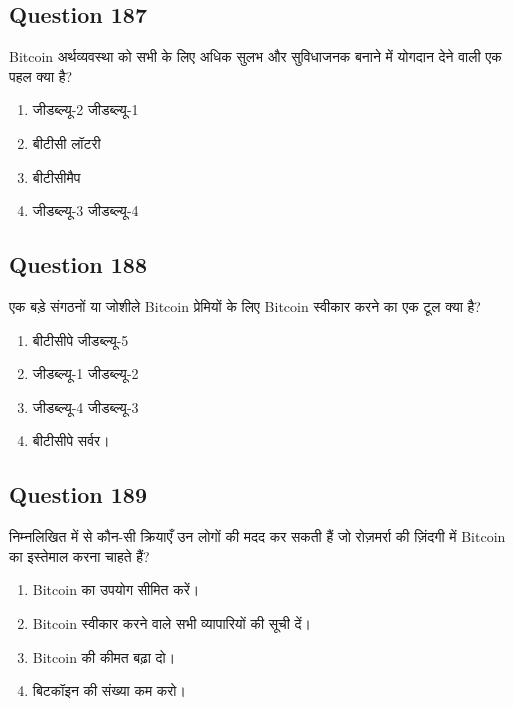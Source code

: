 \documentclass[12pt,a4paper]{article}
\begin{document}
\bigskip


\subsection*{Question 187}
Bitcoin अर्थव्यवस्था को सभी के लिए अधिक सुलभ और सुविधाजनक बनाने में योगदान देने वाली एक पहल क्या है?

\begin{enumerate}[label=\Alph*., leftmargin=*]
\item जीडब्ल्यू-2 जीडब्ल्यू-1
\item बीटीसी लॉटरी
\item बीटीसीमैप
\item जीडब्ल्यू-3 जीडब्ल्यू-4
\end{enumerate}

\bigskip


\subsection*{Question 188}
एक बड़े संगठनों या जोशीले Bitcoin प्रेमियों के लिए Bitcoin स्वीकार करने का एक टूल क्या है?

\begin{enumerate}[label=\Alph*., leftmargin=*]
\item बीटीसीपे जीडब्ल्यू-5
\item जीडब्ल्यू-1 जीडब्ल्यू-2
\item जीडब्ल्यू-4 जीडब्ल्यू-3
\item बीटीसीपे सर्वर।
\end{enumerate}

\bigskip


\subsection*{Question 189}
निम्नलिखित में से कौन-सी क्रियाएँ उन लोगों की मदद कर सकती हैं जो रोज़मर्रा की ज़िंदगी में Bitcoin का इस्तेमाल करना चाहते हैं?

\begin{enumerate}[label=\Alph*., leftmargin=*]
\item Bitcoin का उपयोग सीमित करें।
\item Bitcoin स्वीकार करने वाले सभी व्यापारियों की सूची दें।
\item Bitcoin की कीमत बढ़ा दो।
\item बिटकॉइन की संख्या कम करो।
\end{enumerate}

\bigskip
\end{document}
